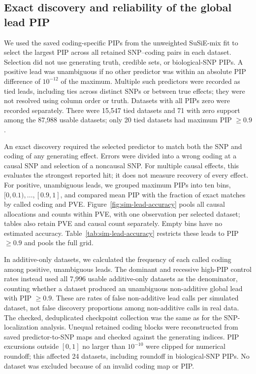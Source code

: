 \documentclass[12pt]{article}
\begin{document}
\subsection{Exact discovery and reliability of the global lead PIP}

We used the saved coding-specific PIPs from the unweighted
SuSiE-mix fit to select the largest PIP across all retained SNP--coding
pairs in each dataset. Selection did not use generating truth, credible
sets, or biological-SNP PIPs. A positive lead was unambiguous if no
other predictor was within an absolute PIP difference of $10^{-12}$
of the maximum. Multiple such predictors were recorded as tied leads,
including ties across distinct SNPs or between true effects; they were
not resolved using column order or truth. Datasets with all PIPs zero
were recorded separately. There were 15,547 tied datasets and 71 with
zero support among the 87,988 usable datasets; only 20 tied datasets
had maximum PIP $\geq 0.9$.

An exact discovery required the selected predictor to match
both the SNP and coding of any generating effect. Errors were divided
into a wrong coding at a causal SNP and selection of a noncausal SNP.
For multiple causal effects, this evaluates the strongest reported hit;
it does not measure recovery of every effect. For positive, unambiguous
leads, we grouped maximum PIPs into ten bins, $[0,0.1),\ldots,[0.9,1]$,
and compared mean PIP with the fraction of exact matches by called
coding and PVE. Figure~\ref{fig:sim-lead-accuracy} pools all causal
allocations and counts within PVE, with one observation per selected
dataset; tables also retain PVE and causal count separately. Empty
bins have no estimated accuracy. Table~\ref{tab:sim-lead-accuracy}
restricts these leads to PIP $\geq 0.9$ and pools the full grid.

In additive-only datasets, we calculated the frequency of
each called coding among positive, unambiguous leads. The dominant
and recessive high-PIP control rates instead used all 7,996 usable
additive-only datasets as the denominator, counting whether a dataset
produced an unambiguous non-additive global lead with PIP $\geq 0.9$.
These are rates of false non-additive lead calls per simulated dataset,
not false discovery proportions among non-additive calls in real data.
The checked, deduplicated checkpoint collection was the same as for
the SNP-localization analysis. Unequal retained coding blocks were
reconstructed from saved predictor-to-SNP maps and checked against
the generating indices. PIP excursions outside $[0,1]$ no larger than
$10^{-10}$ were clipped for numerical roundoff; this affected 24
datasets, including roundoff in biological-SNP PIPs. No dataset was
excluded because of an invalid coding map or PIP.
\end{document}
